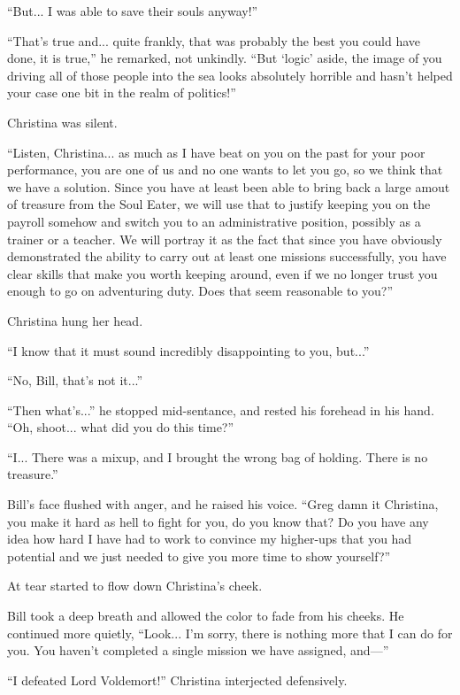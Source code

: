 \documentclass[showtrims,b6paper,draft,10pt]{memoir}
\begin{document}
``But... I was able to save their souls anyway!''

``That's true and... quite frankly, that was probably the best you could have done, it is true,'' he remarked, not unkindly.  ``But `logic' aside, the image of you driving all of those people into the sea looks absolutely horrible and hasn't helped your case one bit in the realm of politics!''

Christina was silent.

``Listen, Christina...  as much as I have beat on you on the past for your poor performance, you are one of us and no one wants to let you go, so we think that we have a solution.  Since you have at least been able to bring back a large amout of treasure from the Soul Eater, we will use that to justify keeping you on the payroll somehow and switch you to an administrative position, possibly as a trainer or a teacher.  We will portray it as the fact that since you have obviously demonstrated the ability to carry out at least one missions successfully, you have clear skills that make you worth keeping around, even if we no longer trust you enough to go on adventuring duty.  Does that seem reasonable to you?''

Christina hung her head.

``I know that it must sound incredibly disappointing to you, but...''

``No, Bill, that's not it...''

``Then what's...'' he stopped mid-sentance, and rested his forehead in his hand.  ``Oh, shoot...  what did you do this time?''

``I...  There was a mixup, and I brought the wrong bag of holding.  There is no treasure.''

Bill's face flushed with anger, and he raised his voice.  ``Greg damn it Christina, you make it hard as hell to fight for you, do you know that?  Do you have any idea how hard I have had to work to convince my higher-ups that you had potential and we just needed to give you more time to show yourself?''

At tear started to flow down Christina's cheek.

Bill took a deep breath and allowed the color to fade from his cheeks.  He continued more quietly,  ``Look... I'm sorry, there is nothing more that I can do for you.  You haven't completed a single mission we have assigned, and---''

``I defeated Lord Voldemort!''  Christina interjected defensively.
\end{document}
